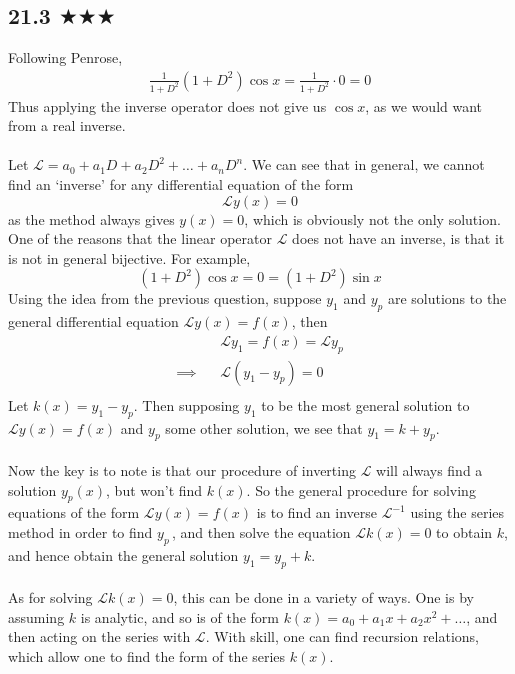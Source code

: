 \subsection{21.3 $\bigstar\bigstar\bigstar$}
Following Penrose, 
\begin{align*}
\frac{1}{1+D^2}(1+D^2)\cos x=\frac{1}{1+D^2}\cdot 0=0
\end{align*}
Thus applying the inverse operator does not give us $\cos x$, as we would want from a real inverse. \\ \\ Let $\mathcal{L}=a_0+a_1 D+a_2D^2+\ldots + a_nD^n$. We can see that in general, we cannot find an `inverse' for any differential equation of the form
$$\mathcal{L}y(x)=0$$
as the method always gives $y(x)=0$, which is obviously not the only solution. One of the reasons that the linear operator $\mathcal{L}$ does not have an inverse, is that it is not in general bijective. For example,
$$ (1+D^2)\cos x=0=(1+D^2)\sin x$$
Using the idea from the previous question, suppose $y_1$ and $y_p$ are solutions to the general differential equation $\mathcal{L} y(x) = f(x)$, then 
\begin{align*}
&\mathcal{L}y_1=f(x)=\mathcal{L}y_p\\
\implies \ \ \ \ & \mathcal{L}(y_1-y_p)=0\\
\end{align*}
Let $k(x)=y_1-y_p$. Then supposing $y_1$ to be the most general solution to $\mathcal{L} y(x) = f(x)$ and $y_p$ some other solution, we see that $y_1=k+y_p$.\\ \\ Now the key is to note is that our procedure of inverting $\mathcal{L}$ will always find a solution $y_p(x)$, but won't find $k(x)$. So the general procedure for solving equations of the form $\mathcal{L} y(x) = f(x)$ is to find an inverse $\mathcal{L}^{-1}$ using the series method in order to find $y_p\,$, and then solve the equation $\mathcal{L} k(x) = 0$ to obtain $k$, and hence obtain the general solution $y_1=y_p+k$.\\ \\
As for solving $\mathcal{L} k(x)=0$, this can be done in a variety of ways. One is by assuming $k$ is analytic, and so is of the form $k(x)=a_0+a_1x+a_2x^2+\ldots$, and then acting on the series with $\mathcal{L}$. With skill, one can find recursion relations, which allow one to find the form of the series $k(x)$.


